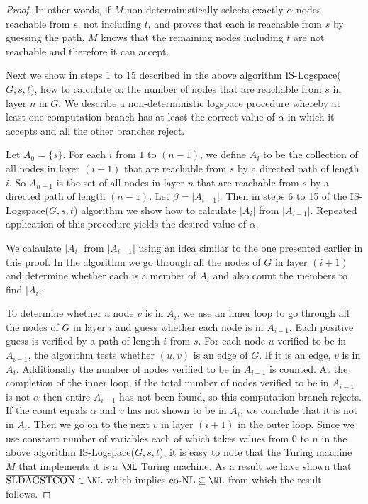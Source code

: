 \documentclass{amsbook}
\theoremstyle{definition}
\theoremstyle{remark}
\numberwithin{section}{chapter}
\numberwithin{equation}{chapter}
\renewcommand{\coNL}{\mbox{\rm co-NL}}
\newcommand{\LDAGSTCON}{\mbox{\rm SLDAGSTCON}}
\begin{document}
\begin{proof}
In other words, if $M$ non-deterministically selects exactly $\alpha$ nodes reachable from $s$, not including $t$, and proves that each is reachable from $s$ by guessing the path, $M$ knows that the remaining nodes including $t$ are not reachable and therefore it can accept.

Next we show in steps 1 to 15 described in the above algorithm IS-Logspace($G,s,t$), how to calculate $\alpha$: the number of nodes that are reachable from $s$ in layer $n$ in $G$. We describe a non-deterministic logspace procedure whereby at least one computation branch has at least the correct value of $\alpha$ in which it accepts and all the other branches reject.

Let $A_0=\{s\}$. For each $i$ from $1$ to $(n-1)$, we define $A_i$ to be the collection of all  nodes in layer $(i+1)$ that are reachable from $s$ by a directed path of length $i$. So $A_{n-1}$ is the set of all nodes in layer $n$ that are reachable from $s$ by a directed path of length $(n-1)$. Let $\beta=|A_{i-1}|$. Then in steps 6 to 15 of the IS-Logspace($G,s,t$) algorithm we show how to calculate $|A_i|$ from $|A_{i-1}|$. Repeated application of this procedure yields the desired value of $\alpha$.

We calaulate $|A_i|$ from $|A_{i-1}|$ using an idea similar to the one presented earlier in this proof. In the algorithm we go through all the nodes of $G$ in layer $(i+1)$ and determine whether each is a member of $A_i$ and also count the members to find $|A_i|$.

To determine whether a node $v$ is in $A_i$, we use an inner loop to go through all the nodes of $G$ in layer $i$ and guess whether each node is in $A_{i-1}$. Each positive guess is verified by a path of length $i$ from $s$. For each node $u$ verified to be in $A_{i-1}$, the algorithm tests whether $(u,v)$ is an edge of $G$. If it is an edge, $v$ is in $A_i$. Additionally the number of nodes verified to be in $A_{i-1}$ is counted. At the completion of the inner loop, if the total number of nodes verified to be in $A_{i-1}$ is not $\alpha$ then entire $A_{i-1}$ has not been found, so this computation branch rejects. If the count equals $\alpha$ and $v$ has not shown to be in $A_i$, we conclude that it is not in $A_i$. Then we go on to the next $v$ in layer $(i+1)$ in the outer loop. Since we use constant number of variables each of which takes values from $0$ to $n$ in the above algorithm IS-Logspace($G,s,t$), it is easy to note that the Turing machine $M$ that implements it is a $\NL$ Turing machine. As a result we have shown that $\overline{\LDAGSTCON}\in\NL$ which implies $\coNL\subseteq\NL$ from which the result follows.
\end{proof}
\end{document}
